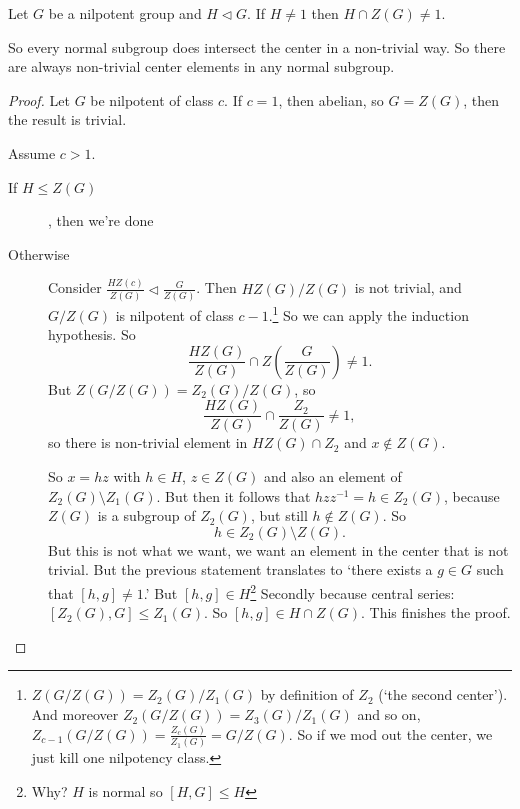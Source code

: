 
\begin{theorem}[16.2.3]
    Let $G$ be a nilpotent group and $H \triangleleft G$.
    If $H \neq 1$ then $H \cap Z(G) \neq 1$.
\end{theorem}

So every normal subgroup does intersect the center in a non-trivial way. So there are always non-trivial center elements in any normal subgroup.

\begin{proof}
    Let $G$ be nilpotent of class $c$.
    If $c = 1$, then abelian, so $G = Z(G)$, then the result is trivial.

    Assume $c>1$.
    \begin{description}
        \item [If $H \le Z(G)$], then we're done
        \item [Otherwise] Consider $ \frac{HZ(c)}{Z(G)} \triangleleft  \frac{G}{Z(G)}$.
            Then $H Z(G) / Z(G)$ is not trivial, and  $G / Z(G)$ is nilpotent of class  $c - 1$.\footnote{
                $Z(G / Z(G)) = Z_2(G) / Z_1(G)$ by definition of $ Z_2$ (`the second center').
                And moreover $ Z_2 (G / Z(G)) = Z_3(G) / Z_1(G)$ and so on, $Z_{c-1}(G / Z(G)) = \frac{Z_c(G)}{Z_1(G)} = G / Z(G)$.
                So if we mod out the center, we just kill one nilpotency class.
            }
            So we can apply the induction hypothesis.
            So
            \[
                \frac{HZ(G)}{Z(G)} \cap Z\left( \frac{G}{Z(G)} \right)  \neq 1
            .\] 
            But $Z(G / Z(G)) = Z_2(G) / Z(G)$, so 
            \[
                \frac{HZ(G)}{Z(G)} \cap  \frac{Z_2}{Z(G)} \neq 1
            ,\] 
            so there is non-trivial element in $HZ(G) \cap Z_2$ and $x \not\in Z(G)$.

            So $x = hz$ with  $h \in H$, $z \in Z(G)$ and also an element of $ Z_2(G) \setminus Z_1(G)$.
            But then it follows that $hz z^{-1} = h \in Z_2(G)$, because $Z(G)$ is a subgroup of  $ Z_2(G)$, but still $h \not\in Z\left( G \right) $.
            So 
            \[
                h \in Z_2(G) \setminus Z(G)
            .\] 
            But this is not what we want, we want an element in the center that is not trivial.
            But the previous statement translates to `there exists a $g \in G$ such that $[h,g] \neq  1$.'
            But $[h, g] \in H$\footnote{Why? $H$ is normal so  $[H, G] \le H$}
            Secondly because central series: $[Z_2(G), G] \le Z_1(G)$.
            So $[h, g] \in H \cap Z(G)$.
            This finishes the proof.
    \end{description}
\end{proof}

